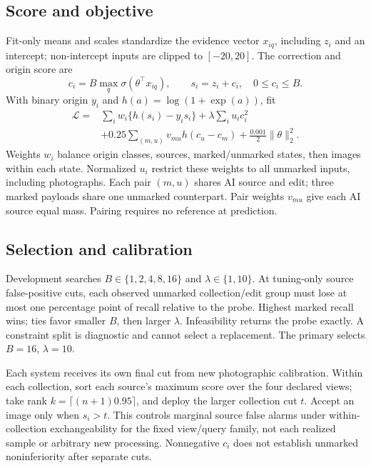 \documentclass[conference]{IEEEtran}
\begin{document}
\subsection{Score and objective}
Fit-only means and scales standardize the evidence vector $x_{iq}$, including
$z_i$ and an intercept; non-intercept inputs are clipped to $[-20,20]$.
The correction and origin score are
\begin{equation}
c_i=B\max_q\sigma(\theta^\top x_{iq}),\qquad s_i=z_i+c_i,\quad 0\le c_i\le B.
\label{eq:score}
\end{equation}
With binary origin $y_i$ and $h(a)=\log(1+\exp(a))$, fit
\begin{align}
\mathcal L={}&\sum_i w_i\{h(s_i)-y_i s_i\}
+\lambda\sum_i u_i c_i^2 \nonumber\\
&+0.25\sum_{(m,u)}v_{mu}h(c_u-c_m)
+\tfrac{0.001}{2}\|\theta\|_2^2 .
\label{eq:loss}
\end{align}
Weights $w_i$ balance origin classes, sources, marked/unmarked states, then
images within each state. Normalized $u_i$ restrict these weights to all unmarked
inputs, including photographs. Each pair $(m,u)$ shares AI source and edit;
three marked payloads share one unmarked counterpart. Pair weights $v_{mu}$
give each AI source equal mass. Pairing requires no reference at prediction.

\subsection{Selection and calibration}
Development searches $B\in\{1,2,4,8,16\}$ and $\lambda\in\{1,10\}$.
At tuning-only source false-positive cuts, each observed unmarked collection/edit
group must lose at most one percentage point of recall relative to the probe.
Highest marked recall wins; ties favor smaller $B$, then larger $\lambda$.
Infeasibility returns the probe exactly. A constraint split is diagnostic
and cannot select a replacement. The primary selects $B=16$, $\lambda=10$.

Each system receives its own final cut from new photographic calibration.
Within each collection, sort each source's maximum score over the four declared
views; take rank $k=\lceil(n+1)0.95\rceil$, and deploy the larger collection
cut $t$. Accept an image only when $s_i>t$. This controls marginal source
false alarms under within-collection exchangeability for the fixed view/query
family, not each realized sample or arbitrary new processing. Nonnegative
$c_i$ does not establish unmarked noninferiority after separate cuts.
\end{document}
